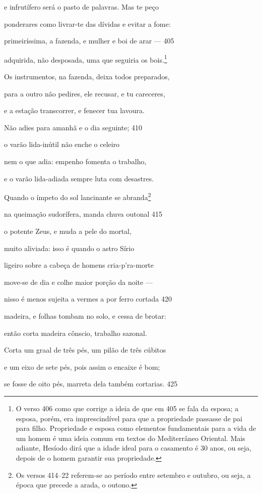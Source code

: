 e infrutífero será o pasto de palavras. Mas te peço

ponderares como livrar-te das dívidas e evitar a fome:

primeiríssima, a fazenda, e mulher e boi de arar --- \num{405}

adquirida, não desposada, uma que seguiria os bois.\footnote{O verso 406 como que corrige a ideia de que em 405 se fala da
esposa; a esposa, porém, era imprescindível para que a propriedade
passasse de pai para filho. Propriedade e esposa como elementos
fundamentais para a vida de um homem é uma ideia comum em textos do
Mediterrâneo Oriental. Mais adiante, Hesíodo dirá que a idade ideal para
o casamento é 30 anos, ou seja, depois de o homem garantir sua
propriedade.}

Os instrumentos, na fazenda, deixa todos preparados,

para a outro não pedires, ele recusar, e tu careceres,

e a estação transcorrer, e fenecer tua lavoura.

Não adies para amanhã e o dia seguinte; \num{410}

o varão lida-inútil não enche o celeiro

nem o que adia: empenho fomenta o trabalho,

e o varão lida-adiada sempre luta com desastres.

Quando o ímpeto do sol lancinante se abranda\footnote{Os versos 414--22 referem-se ao período entre setembro e outubro, ou seja, a época que precede a arada, o outono.}

na queimação sudorífera, manda chuva outonal \num{415}

o potente Zeus, e muda a pele do mortal,

muito aliviada: isso é quando o astro Sírio

ligeiro sobre a cabeça de homens cria-p'ra-morte

move-se de dia e colhe maior porção da noite ---

nisso é menos sujeita a vermes a por ferro cortada \num{420}

madeira, e folhas tombam no solo, e cessa de brotar:

então corta madeira cônscio, trabalho sazonal.

Corta um graal de três pés, um pilão de três cúbitos

e um eixo de sete pés, pois assim o encaixe é bom;

se fosse de oito pés, marreta dela também cortarias. \num{425}

